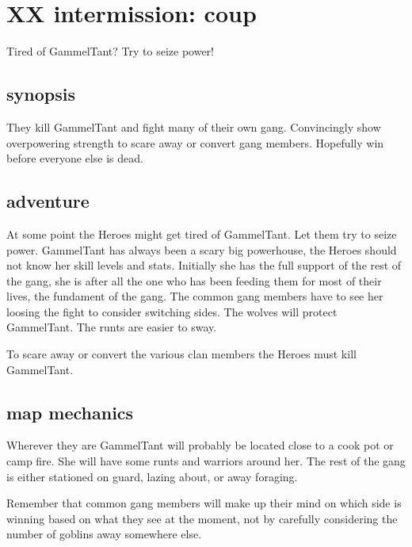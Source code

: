 \clearpage
\section*{XX intermission: coup}

Tired of GammelTant? Try to seize power!


\subsection*{synopsis}

They kill GammelTant and fight many of their own gang. Convincingly show overpowering strength to scare away or convert gang members. Hopefully win before everyone else is dead.


\subsection*{adventure}

At some point the Heroes might get tired of GammelTant. Let them try to seize power. GammelTant has always been a scary big powerhouse, the Heroes should not know her skill levels and stats. Initially she has the full support of the rest of the gang, she is after all the one who has been feeding them for most of their lives, the fundament of the gang. The common gang members have to see her loosing the fight to consider switching sides. The wolves will protect GammelTant. The runts are easier to sway.

To scare away or convert the various clan members the Heroes must kill GammelTant.


\subsection*{map mechanics}

Wherever they are GammelTant will probably be located close to a cook pot or camp fire. She will have some runts and warriors around her. The rest of the gang is either stationed on guard, lazing about, or away foraging.

Remember that common gang members will make up their mind on which side is winning based on what they see at the moment, not by carefully considering the number of goblins away somewhere else.


